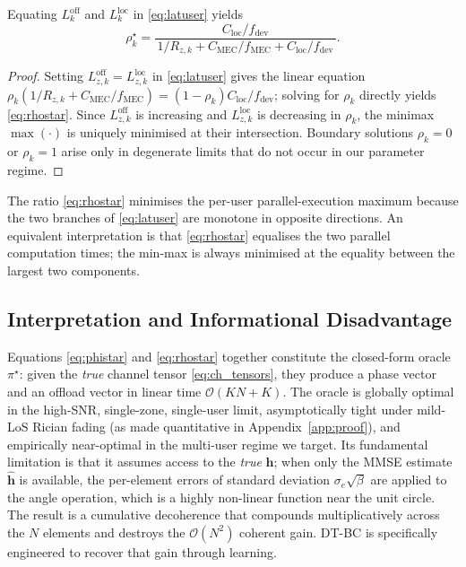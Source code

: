 \documentclass[journal]{IEEEtran}
\newcommand{\vect}[1]{\bm{#1}}
\begin{document}
\begin{proposition}
\label{prop:rho}
Equating $L^{\mathrm{off}}_{k}$ and $L^{\mathrm{loc}}_{k}$ in
\eqref{eq:latuser} yields
\begin{equation}
  \rho_{k}^{\star}=\frac{C_{\mathrm{loc}}/f_{\mathrm{dev}}}
  {\,1/R_{z,k}+C_{\mathrm{MEC}}/f_{\mathrm{MEC}}+C_{\mathrm{loc}}/f_{\mathrm{dev}}\,}.
  \label{eq:rhostar}
\end{equation}
\end{proposition}
\begin{proof}
Setting $L_{z,k}^{\mathrm{off}}\!=\!L_{z,k}^{\mathrm{loc}}$
in \eqref{eq:latuser} gives the linear equation
$\rho_k(1/R_{z,k}+C_{\mathrm{MEC}}/f_{\mathrm{MEC}}) =
(1-\rho_k)C_{\mathrm{loc}}/f_{\mathrm{dev}}$; solving for
$\rho_k$ directly yields \eqref{eq:rhostar}. Since
$L_{z,k}^{\mathrm{off}}$ is increasing and
$L_{z,k}^{\mathrm{loc}}$ is decreasing in $\rho_k$, the
minimax $\max(\cdot)$ is uniquely minimised at their
intersection. Boundary solutions $\rho_k\!=\!0$ or
$\rho_k\!=\!1$ arise only in degenerate limits that do not
occur in our parameter regime.
\end{proof}
The ratio \eqref{eq:rhostar} minimises the per-user parallel-execution
maximum because the two branches of \eqref{eq:latuser} are monotone
in opposite directions. An equivalent interpretation is that
\eqref{eq:rhostar} equalises the two parallel computation times;
the min-max is always minimised at the equality between the largest
two components.

\subsection{Interpretation and Informational Disadvantage}

Equations \eqref{eq:phistar} and \eqref{eq:rhostar} together
constitute the closed-form oracle $\pi^{\star}$: given the
\emph{true} channel tensor \eqref{eq:ch_tensors}, they produce a
phase vector and an offload vector in linear time
$\mathcal{O}(KN\!+\!K)$. The oracle is globally optimal in the
high-SNR, single-zone, single-user limit, asymptotically tight
under mild-LoS Rician fading (as made quantitative in
Appendix~\ref{app:proof}), and empirically near-optimal in the
multi-user regime we target. Its fundamental limitation is that it
assumes access to the \emph{true} $\vect{h}$; when only the MMSE
estimate $\hat{\vect{h}}$ is available, the per-element errors of
standard deviation $\sigma_e\sqrt{\beta}$ are applied to the angle
operation, which is a highly non-linear function near the unit
circle. The result is a cumulative decoherence that compounds
multiplicatively across the $N$ elements and destroys the
$\mathcal{O}(N^2)$ coherent gain. DT-BC is specifically engineered
to recover that gain through learning.
\end{document}
